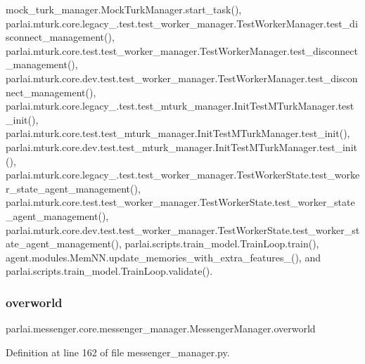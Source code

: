 mock\+\_\+turk\+\_\+manager.\+Mock\+Turk\+Manager.\+start\+\_\+task(), parlai.\+mturk.\+core.\+legacy\+\_.\+test.\+test\+\_\+worker\+\_\+manager.\+Test\+Worker\+Manager.\+test\+\_\+disconnect\+\_\+management(), parlai.\+mturk.\+core.\+test.\+test\+\_\+worker\+\_\+manager.\+Test\+Worker\+Manager.\+test\+\_\+disconnect\+\_\+management(), parlai.\+mturk.\+core.\+dev.\+test.\+test\+\_\+worker\+\_\+manager.\+Test\+Worker\+Manager.\+test\+\_\+disconnect\+\_\+management(), parlai.\+mturk.\+core.\+legacy\+\_.\+test.\+test\+\_\+mturk\+\_\+manager.\+Init\+Test\+M\+Turk\+Manager.\+test\+\_\+init(), parlai.\+mturk.\+core.\+test.\+test\+\_\+mturk\+\_\+manager.\+Init\+Test\+M\+Turk\+Manager.\+test\+\_\+init(), parlai.\+mturk.\+core.\+dev.\+test.\+test\+\_\+mturk\+\_\+manager.\+Init\+Test\+M\+Turk\+Manager.\+test\+\_\+init(), parlai.\+mturk.\+core.\+legacy\+\_.\+test.\+test\+\_\+worker\+\_\+manager.\+Test\+Worker\+State.\+test\+\_\+worker\+\_\+state\+\_\+agent\+\_\+management(), parlai.\+mturk.\+core.\+test.\+test\+\_\+worker\+\_\+manager.\+Test\+Worker\+State.\+test\+\_\+worker\+\_\+state\+\_\+agent\+\_\+management(), parlai.\+mturk.\+core.\+dev.\+test.\+test\+\_\+worker\+\_\+manager.\+Test\+Worker\+State.\+test\+\_\+worker\+\_\+state\+\_\+agent\+\_\+management(), parlai.\+scripts.\+train\+\_\+model.\+Train\+Loop.\+train(), agent.\+modules.\+Mem\+N\+N.\+update\+\_\+memories\+\_\+with\+\_\+extra\+\_\+features\+\_\+(), and parlai.\+scripts.\+train\+\_\+model.\+Train\+Loop.\+validate().

\mbox{\label{classparlai_1_1messenger_1_1core_1_1messenger__manager_1_1MessengerManager_a1136fd856da2014953c613c9fd47c940}} 
\subsubsection{\texorpdfstring{overworld}{overworld}}
{\footnotesize\ttfamily parlai.\+messenger.\+core.\+messenger\+\_\+manager.\+Messenger\+Manager.\+overworld}



Definition at line 162 of file messenger\+\_\+manager.\+py.

